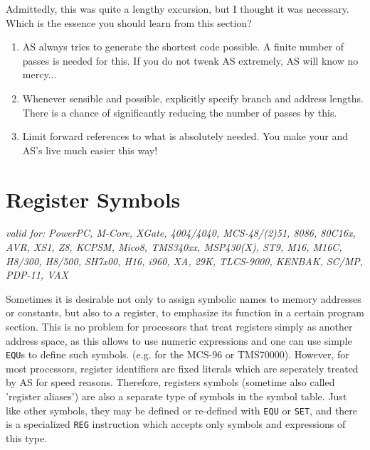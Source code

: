 \documentclass[12pt,twoside]{report}
\makeatletter
\newcommand{\tty}[1]{{\tt #1}}
\newcommand{\ttindex}[1]{\index{#1@{\tt #1}}}
\newcommand{\asname}{{AS}}
\makeatother
\begin{document}
Admittedly, this was quite a lengthy excursion, but I thought it was
necessary.  Which is the essence you should learn from this section?
\begin{enumerate}
\item{\asname{} always tries to generate the shortest code possible.  A
      finite number of passes is needed for this.  If you do not tweak
      \asname{} extremely, \asname{} will know no mercy...}
\item{Whenever sensible and possible, explicitly specify branch and
      address lengths.  There is a chance of significantly reducing the
      number of passes by this.}
\item{Limit forward references to what is absolutely needed.  You make
      your and \asname{}'s live much easier this way!}
\end{enumerate}


\section{Register Symbols}
\label{SectRegSyms} \ttindex{Register Symbols}

{\em valid for: PowerPC, M-Core, XGate, 4004/4040, MCS-48/(2)51, 8086,
     80C16x, AVR, XS1, Z8, KCPSM, Mico8, TMS340xx, MSP430(X), ST9, M16,
     M16C, H8/300, H8/500, SH7x00, H16, i960, XA, 29K, TLCS-9000, KENBAK,
     SC/MP, PDP-11, VAX}

Sometimes it is desirable not only to assign symbolic names to memory
addresses or constants, but also to a register, to emphasize its function
in a certain program section.  This is no problem for processors that
treat registers simply as another address space, as this allows to use
numeric expressions and one can use simple \tty{EQU}s to define such
symbols.  (e.g. for the MCS-96 or TMS70000).  However, for most
processors, register identifiers are fixed literals which are seperately
treated by \asname{} for speed reasons.  Therefore, registers symbols (sometime
also called 'register aliases') are also a separate type of symbols in
the symbol table.  Just like other symbols, they may be defined or re-defined
with \tty{EQU} or \tty{SET}, and there is a specialized \tty{REG} instruction
which accepts only symbols and expressions of this type.
\end{document}
